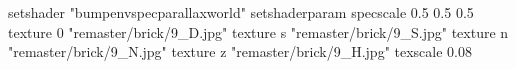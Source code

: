 setshader "bumpenvspecparallaxworld"
setshaderparam specscale 0.5 0.5 0.5
    texture 0 "remaster/brick/9_D.jpg"
    texture s "remaster/brick/9_S.jpg"
    texture n "remaster/brick/9_N.jpg"
    texture z "remaster/brick/9_H.jpg"
    texscale 0.08